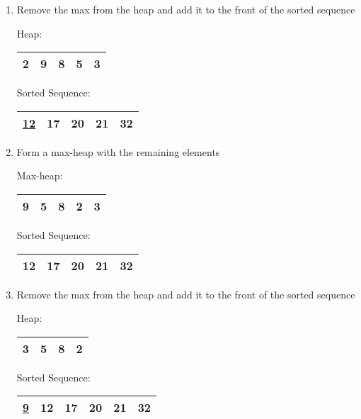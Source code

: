 \documentclass[fleqn, 12pt]{article}
\begin{document}
\begin{enumerate}[Step 1:]
\item Remove the max from the heap and add it to the front of the sorted sequence
    \begin{center}
        Heap:
        \begin{tabular}{|*{5}{c|}}
            \hline
            2 & 9 & 8 & 5 & 3\\
            \hline
        \end{tabular}
    \end{center}
    \begin{center}
        Sorted Sequence:
        \begin{tabular}{|*{5}{c|}}
            \hline
            \underline{12} & 17 & 20 & 21 & 32\\
            \hline
        \end{tabular}
    \end{center}
    
\item Form a max-heap with the remaining elements
    \begin{center}
        Max-heap:
        \begin{tabular}{|*{5}{c|}}
            \hline
            9 & 5 & 8 & 2 & 3\\
            \hline
        \end{tabular}
    \end{center}
    \begin{center}
        Sorted Sequence:
        \begin{tabular}{|*{5}{c|}}
            \hline
            12 & 17 & 20 & 21 & 32\\
            \hline
        \end{tabular}
    \end{center}
    
\item Remove the max from the heap and add it to the front of the sorted sequence
    \begin{center}
        Heap:
        \begin{tabular}{|*{4}{c|}}
            \hline
            3 & 5 & 8 & 2\\
            \hline
        \end{tabular}
    \end{center}
    \begin{center}
        Sorted Sequence:
        \begin{tabular}{|*{6}{c|}}
            \hline
            \underline{9} & 12 & 17 & 20 & 21 & 32\\
            \hline
        \end{tabular}
    \end{center}
    

\end{enumerate}
\end{document}
